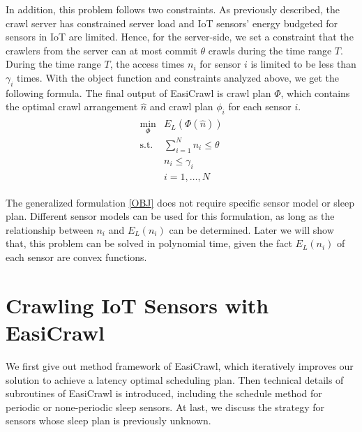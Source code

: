 \documentclass[conference]{IEEEtran}
\begin{document}
In addition, this problem follows two constraints. 
As previously described, the crawl server has constrained server load and IoT sensors' energy budgeted for sensors in IoT are limited. 
Hence, for the server-side, we set a constraint that the crawlers from the server can at most commit $\theta$ crawls during the time range $T$. 
During the time range $T$, the access times $n_i$ for sensor $i$ is limited to be less than $\gamma_i$ times. 
With the object function and constraints analyzed above, we get the following formula.
The final output of EasiCrawl is crawl plan $\Phi$, which contains the optimal crawl arrangement $\hat{n}$ and crawl plan $\phi_i$ for each sensor $i$.
\begin{eqnarray}
\begin{array}{ll}
\min_{\Phi}& E_L(\Phi(\hat{n}))\\
\text{s.t.}
& \sum_{i=1}^{N} n_i \leq\theta\\
&n_i\leq\gamma_i\\
&i=1,\ldots,N
\end{array}\label{OBJ}
\end{eqnarray}

The generalized formulation \eqref{OBJ} does not require specific sensor model or sleep plan. 
Different sensor models can be used for this formulation, as long as the relationship between $n_i$ and $E_L(n_i)$ can be determined.
Later we will show that, this problem can be solved in polynomial time, given the fact $E_L(n_i)$ of each sensor are convex functions.

\section{Crawling IoT Sensors with EasiCrawl} \label{easicrawl}

We first give out method framework of EasiCrawl, which iteratively improves our solution to achieve a latency optimal scheduling plan. 
Then technical details of subroutines of EasiCrawl is introduced, including the schedule method for periodic or none-periodic sleep sensors. At last, we discuss the strategy for sensors whose sleep plan is previously unknown.
\end{document}
